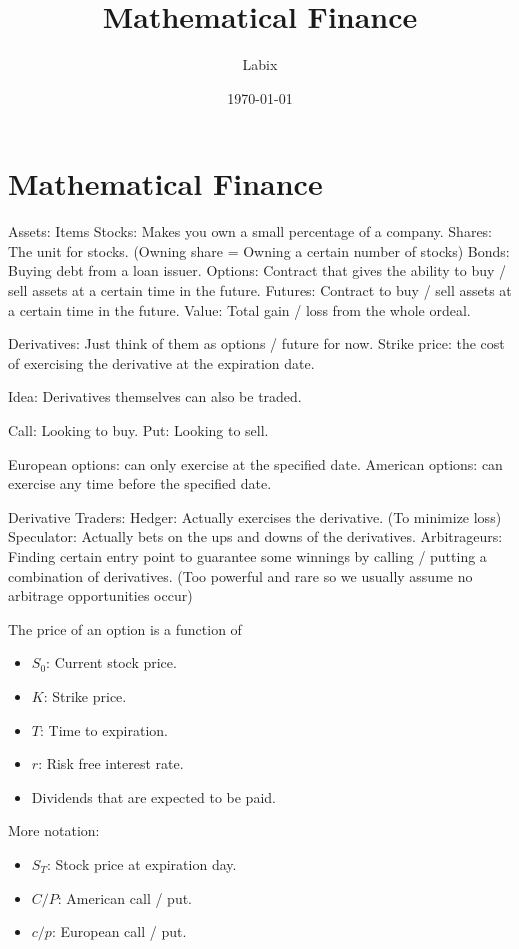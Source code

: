 \documentclass[a4paper]{article}
\title{Mathematical Finance}
\author{Labix}
\date{\today}
\begin{document}
\maketitle
\tableofcontents

\pagebreak
\section{Mathematical Finance}
Assets: Items
Stocks: Makes you own a small percentage of a company. 
Shares: The unit for stocks. (Owning share = Owning a certain number of stocks)
Bonds: Buying debt from a loan issuer. 
Options: Contract that gives the ability to buy / sell assets at a certain time in the future. 
Futures: Contract to buy / sell assets at a certain time in the future. 
Value: Total gain / loss from the whole ordeal. 

Derivatives: Just think of them as options / future for now. 
Strike price: the cost of exercising the derivative at the expiration date. 

Idea: Derivatives themselves can also be traded. 

Call: Looking to buy. 
Put: Looking to sell. 

European options: can only exercise at the specified date. 
American options: can exercise any time before the specified date. 

Derivative Traders: 
Hedger: Actually exercises the derivative. (To minimize loss)
Speculator: Actually bets on the ups and downs of the derivatives. 
Arbitrageurs: Finding certain entry point to guarantee some winnings by calling / putting a combination of derivatives. (Too powerful and rare so we usually assume no arbitrage opportunities occur)

The price of an option is a function of 
\begin{itemize}
\item $S_0$: Current stock price. 
\item $K$: Strike price. 
\item $T$: Time to expiration. 
\item $r$: Risk free interest rate. 
\item Dividends that are expected to be paid. 
\end{itemize}
More notation: 
\begin{itemize}
\item $S_T$: Stock price at expiration day. 
\item $C/P$: American call / put. 
\item $c/p$: European call / put. 
\end{itemize}
\end{document}
